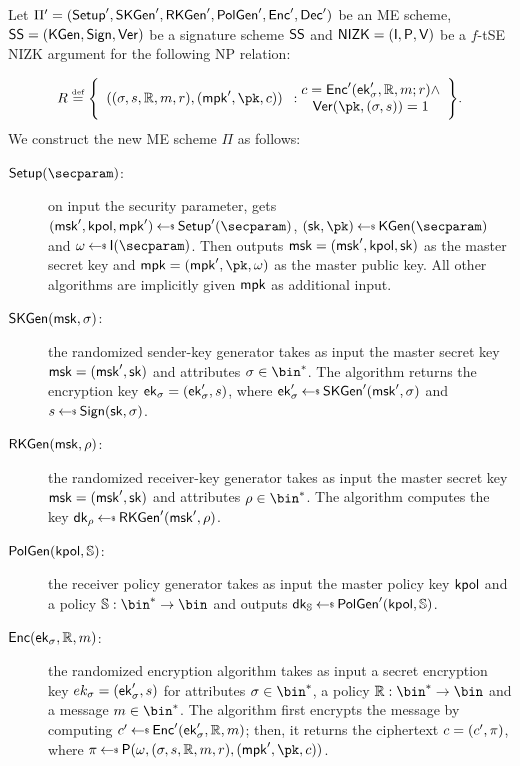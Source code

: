 \begin{construction}\label{constr:me_nizk}
    Let $\Pi'=(\mathsf{Setup}',\mathsf{SKGen}',\mathsf{RKGen}', \mathsf{PolGen}', \mathsf{Enc}',\mathsf{Dec}')$ be an ME scheme, $\mathsf{SS} =(\mathsf{KGen},\mathsf{Sign},\mathsf{Ver})$ be a signature scheme $\mathsf{SS}$ and $\mathsf{NIZK}=(\mathsf{I},\mathsf{P},\mathsf{V})$ be a $f$-tSE NIZK argument for the following NP relation:

    \[
        R \eqdef \Biggl\{ \begin{array}{c}((\sattr, \signature, \raccess, \msg, r),(\mpk', \pk, \cipher))\end{array}:\begin{array}{@{}c}
            \cipher = \enc'(\ek'_\sattr, \raccess, \msg; r) \land \\
            \ver(\pk, (\sattr, \signature)) = 1
        \end{array} \Biggr\}.
    \]
    \newline\newline
    We construct the new ME scheme $\Pi$ as follows:
    \begin{description}
        \item[$\setup(\secparam)$:] on input the security parameter, gets $(\msk', \kpol, \mpk') \getsr \setup'(\secparam)$, $(\sk, \pk) \getsr \kgen(\secparam)$ and $\crs \getsr \init(\secparam)$. Then outputs $\mathsf{msk} = (\mathsf{msk}', \mathsf{kpol}, \mathsf{sk})$ as the master secret key and $\mpk = (\mpk', \pk, \crs)$ as the master public key. All other algorithms are implicitly given $\mathsf{mpk}$ as additional input.
        \item[$\mathsf{SKGen}(\mathsf{msk}, \sigma)$:] the randomized sender-key generator takes as input the master secret key $\mathsf{msk} = (\mathsf{msk}', \mathsf{sk})$ and attributes $\sattr \in \bin^*$. The algorithm returns the encryption key $\mathsf{ek}_\sigma = (\mathsf{ek}'_\sigma, s)$, where $\ek'_\sattr \getsr \skgen'(\msk', \sattr)$ and $\signature \getsr \sign(\sk, \sattr)$.
        \item[$\mathsf{RKGen}(\mathsf{msk}, \rho)$:] the randomized receiver-key generator takes as input the master secret key $\mathsf{msk} = (\mathsf{msk}', \mathsf{sk})$ and attributes $\rattr \in \bin^*$. The algorithm computes the key $\dk_\rattr \getsr \rkgen'(\msk', \rattr)$.
        \item[$\mathsf{PolGen}(\mathsf{kpol}, \mathbb{S})$:] the receiver policy generator takes as input the master policy key $\mathsf{kpol}$ and a policy $\saccess: \bin^* \to \bin$ and outputs $\dk_\saccess \getsr \polgen'(\kpol, \saccess)$.
        \item[$\mathsf{Enc}(\mathsf{ek}_\sigma, \mathbb{R}, m)$:] the randomized encryption algorithm takes as input a secret encryption key $ek_\sigma = (\mathsf{ek}'_\sigma, s)$ for attributes $\sattr \in \bin^*$, a policy $\raccess: \bin^* \to \bin$ and a message $\msg \in \bin^*$. The algorithm first encrypts the message by computing $\cipher' \getsr \enc'(\ek'_\sattr, \raccess, \msg)$; then, it returns the ciphertext $c = (c', \pi)$, where $\pi \getsr \prover(\crs, (\sattr, \signature, \raccess, \msg, r),(\mpk', \pk, \cipher))$.

\end{description}
\end{construction}
